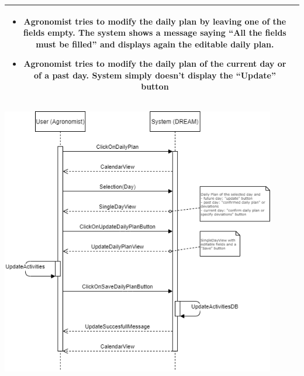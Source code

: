 \documentclass{article}
\begin{document}
\begin{center}
\begin{longtable}{|c| p{10cm}|}
\begin{itemize}
                            \item Agronomist tries to modify the daily plan by leaving one of the fields empty. The system shows a message saying “All the fields must be filled” and displays again the editable daily plan.
                            \item Agronomist tries to modify the daily plan of the current day or of a past day. System simply doesn’t display the “Update” button 
                        \end{itemize}\\
        \hline
    \end{longtable}
    
    \includegraphics[width=0.9\textwidth]{images/sequenceDiagrams/16. AgronomistUpdateDailyPlan.png}
    \par
    \caption{\label{fig:frog}Agronomist updates daily plan}

    \newpage
    
    
    
    
    
    
    
    
    
    

\end{center}
\end{document}

